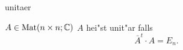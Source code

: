 \documentclass[class=article, crop=false]{standalone}
\begin{document}
\begin{zettel}{unitaer}
\begin{flashcard}
    $ A \in  \operatorname{Mat}(n \times n; \mathbb{C} )$
    $A$ hei"st unit"ar falls
\[
    \bar{A}^t \cdot  A = E_n
.\]
\end{flashcard}
\end{zettel}
\end{document}
